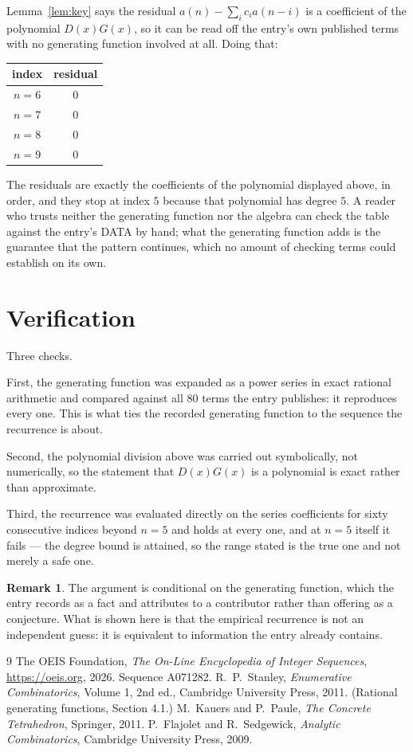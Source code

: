 \documentclass[11pt,a4paper]{article}
\theoremstyle{plain}
\theoremstyle{definition}
\newtheorem{remark}[theorem]{Remark}
\begin{document}
Lemma~\ref{lem:key} says the residual $a(n)-\sum_ic_ia(n-i)$ is a coefficient of the
polynomial $D(x)G(x)$, so it can be read off the entry's own published terms with no
generating function involved at all. Doing that:
\begin{center}
\begin{tabular}{cc}
index & residual \\ \hline
$n=6$ & $0$ \\
$n=7$ & $0$ \\
$n=8$ & $0$ \\
$n=9$ & $0$
\end{tabular}
\end{center}
The residuals are exactly the coefficients of the polynomial displayed above, in order, and
they stop at index $5$ because that polynomial has degree $5$. A reader who trusts
neither the generating function nor the algebra can check the table against the entry's DATA
by hand; what the generating function adds is the guarantee that the pattern continues, which
no amount of checking terms could establish on its own.

\section{Verification}

Three checks.

First, the generating function was expanded as a power series in exact rational arithmetic and
compared against all $80$ terms the entry publishes: it reproduces every one. This is
what ties the recorded generating function to the sequence the recurrence is about.

Second, the polynomial division above was carried out symbolically, not numerically, so the
statement that $D(x)G(x)$ is a polynomial is exact rather than approximate.

Third, the recurrence was evaluated directly on the series coefficients for sixty consecutive
indices beyond $n=5$ and holds at every one, and at $n=5$ itself it fails --- the
degree bound is attained, so the range stated is the true one and not merely a safe one.

\begin{remark}
The argument is conditional on the generating function, which the entry records as a fact and
attributes to a contributor rather than offering as a conjecture. What is shown here is that
the empirical recurrence is not an independent guess: it is equivalent to information the
entry already contains.
\end{remark}

\begin{thebibliography}{9}
 The OEIS Foundation, \emph{The On-Line Encyclopedia of Integer
Sequences}, \url{https://oeis.org}, 2026. Sequence A071282.
 R.~P.~Stanley, \emph{Enumerative Combinatorics}, Volume 1, 2nd ed.,
Cambridge University Press, 2011. (Rational generating functions, Section 4.1.)
 M.~Kauers and P.~Paule, \emph{The Concrete Tetrahedron}, Springer, 2011.
 P.~Flajolet and R.~Sedgewick, \emph{Analytic Combinatorics}, Cambridge
University Press, 2009.
\end{thebibliography}
\end{document}
